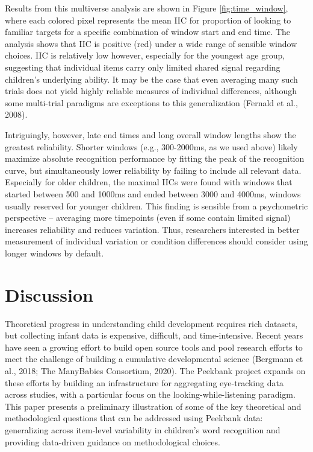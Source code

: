 \documentclass[10pt, letterpaper]{article}
\begin{document}
Results from this multiverse analysis are shown in Figure
\ref{fig:time_window}, where each colored pixel represents the mean IIC
for proportion of looking to familiar targets for a specific combination
of window start and end time. The analysis shows that IIC is positive
(red) under a wide range of sensible window choices. IIC is relatively
low however, especially for the youngest age group, suggesting that
individual items carry only limited shared signal regarding children's
underlying ability. It may be the case that even averaging many such
trials does not yield highly reliable measures of individual
differences, although some multi-trial paradigms are exceptions to this
generalization (Fernald et al., 2008).

Intriguingly, however, late end times and long overall window lengths
show the greatest reliability. Shorter windows (e.g., 300-2000ms, as we
used above) likely maximize absolute recognition performance by fitting
the peak of the recognition curve, but simultaneously lower reliability
by failing to include all relevant data. Especially for older children,
the maximal IICs were found with windows that started between 500 and
1000ms and ended between 3000 and 4000ms, windows usually reserved for
younger children. This finding is sensible from a psychometric
perspective -- averaging more timepoints (even if some contain limited
signal) increases reliability and reduces variation. Thus, researchers
interested in better measurement of individual variation or condition
differences should consider using longer windows by default.

\hypertarget{discussion}{%
\section{Discussion}\label{discussion}}

Theoretical progress in understanding child development requires rich
datasets, but collecting infant data is expensive, difficult, and
time-intensive. Recent years have seen a growing effort to build open
source tools and pool research efforts to meet the challenge of building
a cumulative developmental science (Bergmann et al., 2018; The
ManyBabies Consortium, 2020). The Peekbank project expands on these
efforts by building an infrastructure for aggregating eye-tracking data
across studies, with a particular focus on the looking-while-listening
paradigm. This paper presents a preliminary illustration of some of the
key theoretical and methodological questions that can be addressed using
Peekbank data: generalizing across item-level variability in children's
word recognition and providing data-driven guidance on methodological
choices.
\end{document}
